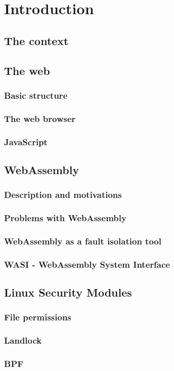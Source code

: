 \chapter{Introduction}

\section{The context}

\section{The web}
\subsection{Basic structure}
\subsection{The web browser}
\subsection{JavaScript}

\section{WebAssembly}
\subsection{Description and motivations}
\subsection{Problems with WebAssembly}
\subsection{WebAssembly as a fault isolation tool}
\subsection{WASI - WebAssembly System Interface}

\section{Linux Security Modules}
\subsection{File permissions}
\subsection{Landlock}
\subsection{BPF}